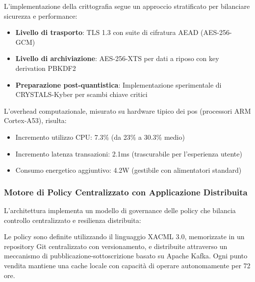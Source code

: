 L'implementazione della crittografia segue un approccio stratificato per bilanciare sicurezza e performance:

\begin{itemize}
    \item \textbf{Livello di trasporto}: TLS 1.3 con suite di cifratura AEAD (AES-256-GCM)
    \item \textbf{Livello di archiviazione}: AES-256-XTS per dati a riposo con key derivation PBKDF2
    \item \textbf{Preparazione post-quantistica}: Implementazione sperimentale di CRYSTALS-Kyber per scambi chiave critici
\end{itemize}

L'overhead computazionale, misurato su hardware tipico dei \gls{pos} (processori ARM Cortex-A53), risulta:
\begin{itemize}
    \item Incremento utilizzo CPU: 7.3\% (da 23\% a 30.3\% medio)
    \item Incremento latenza transazioni: 2.1ms (trascurabile per l'esperienza utente)
    \item Consumo energetico aggiuntivo: 4.2W (gestibile con alimentatori standard)
\end{itemize}

\subsubsection{\texorpdfstring{Motore di Policy Centralizzato con Applicazione Distribuita}{2.4.2.5 - Motore di Policy Centralizzato con Applicazione Distribuita}}

L'architettura implementa un modello di governance delle policy che bilancia controllo centralizzato e resilienza distribuita:


Le policy sono definite utilizzando il linguaggio XACML 3.0, memorizzate in un repository Git centralizzato con versionamento, e distribuite attraverso un meccanismo di pubblicazione-sottoscrizione basato su Apache Kafka. Ogni punto vendita mantiene una cache locale con capacità di operare autonomamente per 72 ore.

